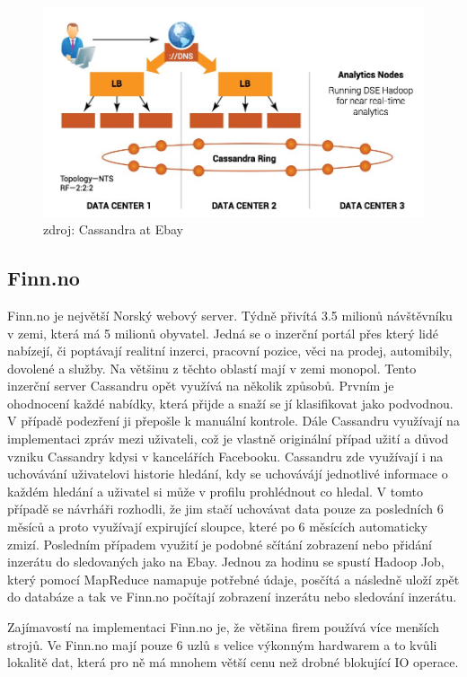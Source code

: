 \documentclass[thesis=M,czech]{FITthesis}[2012/06/26]
\begin{document}
\begin{figure}[h]
\centering
\includegraphics[scale=0.4]{images/ebay}
\caption{zdroj:  Cassandra at Ebay \cite{ebay}}
\label{fig:timeseries1}
\end{figure}

\subsection{Finn.no}
Finn.no je největší Norský webový server. Týdně přivítá 3.5 milionů návštěvníku v zemi, která má 5 milionů obyvatel. Jedná se o inzerční portál přes který lidé nabízejí, či poptávají realitní inzerci, pracovní pozice, věci na prodej, automibily, dovolené a služby. Na většinu z těchto oblastí mají v zemi monopol. Tento inzerční server Cassandru opět využívá na několik způsobů. Prvním je ohodnocení každé nabídky, která přijde a snaží se jí klasifikovat jako podvodnou. V případě podezření ji přepošle k manuální kontrole. Dále Cassandru využívají na implementaci zpráv mezi uživateli, což je vlastně originální případ užití a důvod vzniku Cassandry kdysi v kancelářích Facebooku. Cassandru zde využívají i na uchovávání uživatelovi historie hledání, kdy se uchovávájí jednotlivé informace o každém hledání a uživatel si může v profilu prohlédnout co hledal. V tomto případě se návrháři rozhodli, že jim stačí uchovávat data pouze za posledních 6 měsíců a proto využívají expirující sloupce, které po 6 měsících automaticky zmizí. Posledním případem využití je podobné sčítání zobrazení nebo přidání inzerátu do sledovaných jako na Ebay. Jednou za hodinu se spustí Hadoop Job, který pomocí MapReduce namapuje potřebné údaje, posčítá a následně uloží zpět do databáze a tak ve Finn.no počítají zobrazení inzerátu nebo sledování inzerátu. 

Zajímavostí na implementaci Finn.no je, že většina firem používá více menších strojů. Ve Finn.no mají pouze 6 uzlů s velice výkonným hardwarem a to kvůli lokalitě dat, která pro ně má mnohem větší cenu než drobné blokující IO operace. 
\end{document}

